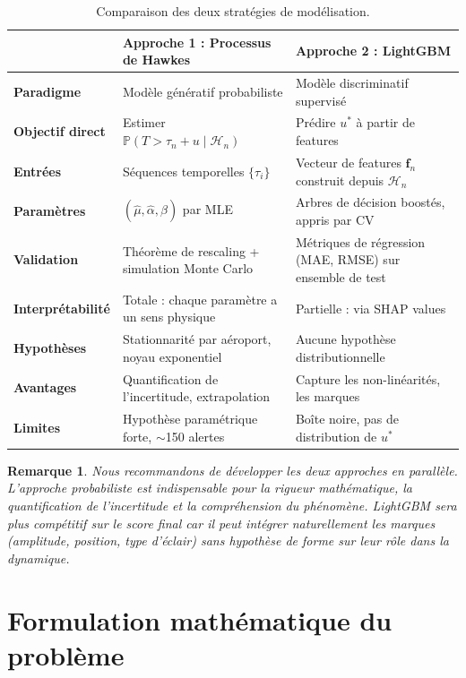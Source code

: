 \documentclass[a4paper,11pt]{article}
\newtheorem{remarque}{Remarque}[section]
\begin{document}
\begin{table}[H]
\centering
\renewcommand{\arraystretch}{1.4}
\begin{tabular}{>{\bfseries}p{3.2cm} p{5.8cm} p{5.8cm}}
\toprule
 & \textbf{Approche 1 : Processus de Hawkes} & \textbf{Approche 2 : LightGBM} \\
\midrule
Paradigme & Modèle génératif probabiliste & Modèle discriminatif supervisé \\
Objectif direct & Estimer $\mathbb{P}(T > \tau_n + u \mid \mathcal{H}_n)$ & Prédire $u^*$ à partir de features \\
Entrées & Séquences temporelles $\{\tau_i\}$ & Vecteur de features $\mathbf{f}_n$ construit depuis $\mathcal{H}_n$ \\
Paramètres & $(\hat\mu, \hat\alpha, \hat\beta)$ par MLE & Arbres de décision boostés, appris par CV \\
Validation & Théorème de rescaling + simulation Monte Carlo & Métriques de régression (MAE, RMSE) sur ensemble de test \\
Interprétabilité & Totale : chaque paramètre a un sens physique & Partielle : via SHAP values \\
Hypothèses & Stationnarité par aéroport, noyau exponentiel & Aucune hypothèse distributionnelle \\
Avantages & Quantification de l'incertitude, extrapolation & Capture les non-linéarités, les marques \\
Limites & Hypothèse paramétrique forte, $\sim$150 alertes & Boîte noire, pas de distribution de $u^*$ \\
\bottomrule
\end{tabular}
\caption{Comparaison des deux stratégies de modélisation.}
\label{tab:comparaison}
\end{table}

\begin{remarque}
Nous recommandons de développer les deux approches en parallèle. L'approche probabiliste est indispensable pour la rigueur mathématique, la quantification de l'incertitude et la compréhension du phénomène. LightGBM sera plus compétitif sur le score final car il peut intégrer naturellement les marques (amplitude, position, type d'éclair) sans hypothèse de forme sur leur rôle dans la dynamique.
\end{remarque}

\section{Formulation mathématique du problème}
\end{document}
